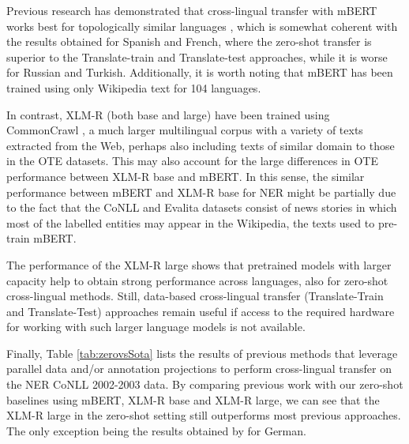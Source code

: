 \documentclass[11pt]{article}
\begin{document}
Previous research has demonstrated that cross-lingual transfer with mBERT works best for topologically similar languages \cite{pires-etal-2019-multilingual,wu-dredze-2020-languages}, which is somewhat coherent with the results obtained for Spanish and French, where the zero-shot transfer is superior to the Translate-train and Translate-test approaches, while it is worse for Russian and Turkish. Additionally, it is worth noting that mBERT has been trained using only Wikipedia text for 104 languages.


In contrast, XLM-R (both base and large) have been trained using CommonCrawl \cite{DBLP:journals/corr/abs-1911-00359}, a much larger multilingual corpus with a variety of texts extracted from the Web, perhaps also including texts of similar domain to those in the OTE datasets. This may also account for the large differences in OTE performance between XLM-R base and mBERT. In this sense, the similar performance between mBERT and XLM-R base for NER might be partially due to the fact that the CoNLL and Evalita datasets consist of news stories in which most of the labelled entities may appear in the Wikipedia, the texts used to pre-train mBERT. 

The performance of the XLM-R large shows that pretrained models with larger capacity help to obtain strong performance across languages, also for zero-shot cross-lingual methods. Still, data-based cross-lingual transfer (Translate-Train and Translate-Test) approaches remain useful if access to the required hardware for working with such larger language models is not available. 




Finally, Table \ref{tab:zerovsSota} lists the results of previous methods that leverage parallel data and/or annotation projections to perform cross-lingual transfer on the NER CoNLL 2002-2003 data. By comparing previous work with our zero-shot baselines using  mBERT, XLM-R base and XLM-R large, we can see that the XLM-R large in the zero-shot setting still outperforms most previous approaches. The only exception being the results obtained by \citet{Li2021crosslingualNE} for German.
\end{document}
